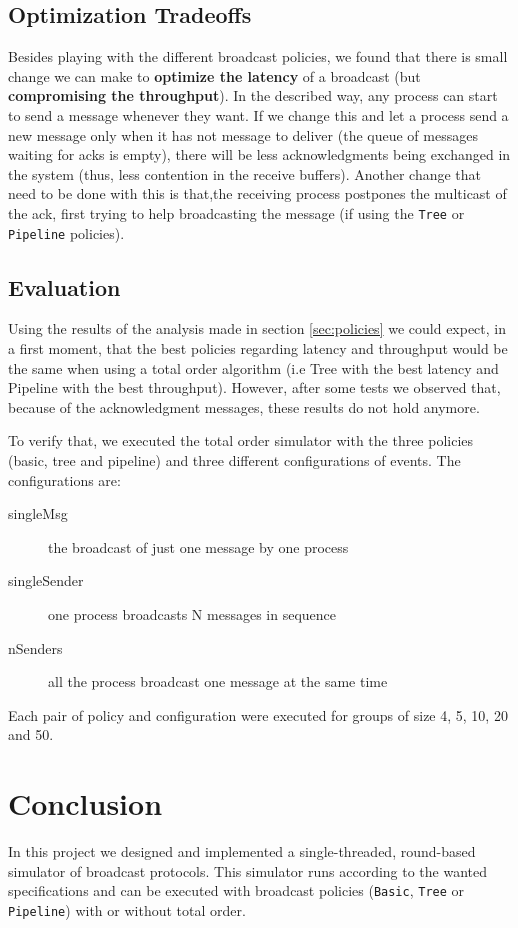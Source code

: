 \documentclass[a4paper, 11pt]{article}
\begin{document}
\subsection{Optimization Tradeoffs}
	Besides playing with the different broadcast policies, we found that there is small change we can make to \textbf{optimize the latency} of a broadcast (but \textbf{compromising the throughput}). In the described way, any process can start to send a message whenever they want. If we change this and let a process send a new message only when it has not message to deliver (the queue of messages waiting for acks is empty), there will be less acknowledgments being exchanged in the system (thus, less contention in the receive buffers). Another change that need to be done with this is that,the receiving process postpones the multicast of the ack, first trying to help broadcasting the message (if using the \texttt{Tree} or \texttt{Pipeline} policies).

\subsection{Evaluation}
	Using the results of the analysis made in section \ref{sec:policies} we could expect, in a first moment, that the best policies regarding latency and throughput would be the same when using a total order algorithm (i.e Tree with the best latency and Pipeline with the best throughput). However, after some tests we observed that, because of the acknowledgment messages, these results do not hold anymore.
	
	To verify that, we executed the total order simulator with the three policies (basic, tree and pipeline) and three different configurations of events. The configurations are:
	
\begin{description}
	\item[singleMsg] the broadcast of just one message by one process
	\item[singleSender] one process broadcasts N messages in sequence
	\item[nSenders] all the process broadcast one message at the same time
\end{description}

Each pair of policy and configuration were executed for groups of size 4, 5, 10, 20 and 50.

\newpage
\section{Conclusion}
	In this project we designed and implemented a single-threaded, round-based simulator of broadcast protocols. This simulator runs according to the wanted specifications and can be executed with broadcast policies (\texttt{Basic}, \texttt{Tree} or \texttt{Pipeline}) with or without total order. 
	
\end{document}
